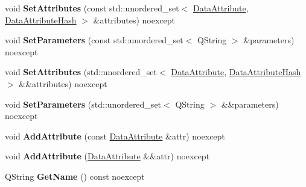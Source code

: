 \begin{DoxyCompactItemize}
\item 
\mbox{\label{classUPIM_1_1DATA_1_1DataFederate_aa08f7741dd7a6328b7254b259f6c3710}} 
void {\bfseries Set\+Attributes} (const std\+::unordered\+\_\+set$<$ \hyperlink{classUPIM_1_1DATA_1_1DataAttribute}{Data\+Attribute}, \hyperlink{structUPIM_1_1DATA_1_1DataAttributeHash}{Data\+Attribute\+Hash} $>$ \&attributes) noexcept
\item 
\mbox{\label{classUPIM_1_1DATA_1_1DataFederate_a584693acb24895a77484e5ba4e9b1359}} 
void {\bfseries Set\+Parameters} (const std\+::unordered\+\_\+set$<$ Q\+String $>$ \&parameters) noexcept
\item 
\mbox{\label{classUPIM_1_1DATA_1_1DataFederate_a71f23151c27b68d298592da85fb92723}} 
void {\bfseries Set\+Attributes} (std\+::unordered\+\_\+set$<$ \hyperlink{classUPIM_1_1DATA_1_1DataAttribute}{Data\+Attribute}, \hyperlink{structUPIM_1_1DATA_1_1DataAttributeHash}{Data\+Attribute\+Hash} $>$ \&\&attributes) noexcept
\item 
\mbox{\label{classUPIM_1_1DATA_1_1DataFederate_a810e594a4d0d8caeeecddd573eac775b}} 
void {\bfseries Set\+Parameters} (std\+::unordered\+\_\+set$<$ Q\+String $>$ \&\&parameters) noexcept
\item 
\mbox{\label{classUPIM_1_1DATA_1_1DataFederate_af2b22691e292892c00a4c3d4c7c30f19}} 
void {\bfseries Add\+Attribute} (const \hyperlink{classUPIM_1_1DATA_1_1DataAttribute}{Data\+Attribute} \&attr) noexcept
\item 
\mbox{\label{classUPIM_1_1DATA_1_1DataFederate_ae24e08af48c9d0e11ca32f1ee8d40fa5}} 
void {\bfseries Add\+Attribute} (\hyperlink{classUPIM_1_1DATA_1_1DataAttribute}{Data\+Attribute} \&\&attr) noexcept
\item 
\mbox{\label{classUPIM_1_1DATA_1_1DataFederate_a04e483286e77ee5a11370e29073cb751}} 
Q\+String {\bfseries Get\+Name} () const noexcept
\item 
\mbox{\label{classUPIM_1_1DATA_1_1DataFederate_a8f8dd82f769f3eafe2a856c22c5031ae}} 

\end{DoxyCompactItemize}
